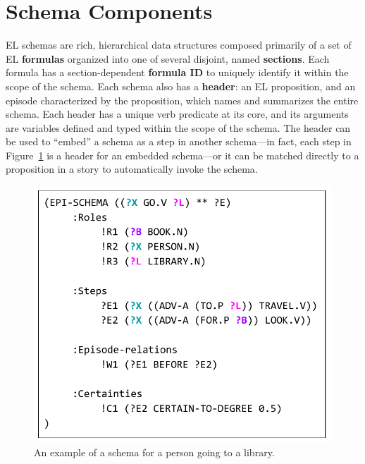 \section{Schema Components}
\label{sec:schema_def}
EL schemas are rich, hierarchical data structures composed primarily of a set of EL \textbf{formulas} organized into one of several disjoint, named \textbf{sections}.
Each formula has a section-dependent \textbf{formula ID} to uniquely identify it within the scope of the schema.
Each schema also has a \textbf{header}: an EL proposition, and an episode characterized by the proposition, which names and summarizes the entire schema. 
Each header has a unique verb predicate at its core, and its arguments are variables defined and typed within the scope of the schema.
The header can be used to ``embed'' a schema as a step in another schema---in fact, each step in Figure~\ref{fig:libschema} is a header for an embedded schema---or it can be matched directly to a proposition in a story to automatically invoke the schema.

\begin{figure}
    \centering
    \includegraphics[width=0.65\columnwidth]{CH3_schemas/egschema.pdf}
    \caption{An example of a schema for a person going to a library.}
    \label{fig:libschema}
\end{figure}

